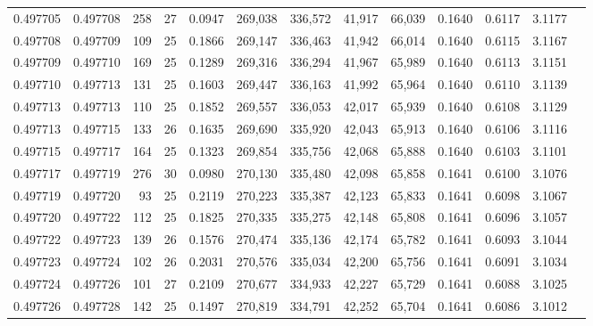 \begin{tabular}{rrrrrrrrrrrrr}
0.497705 & 0.497708 & 258 &  27 &                                     0.0947 & 269,038 & 336,572 &  41,917 &  66,039 & 0.1640 & 0.6117 & 3.1177 \\
0.497708 & 0.497709 & 109 &  25 &                                     0.1866 & 269,147 & 336,463 &  41,942 &  66,014 & 0.1640 & 0.6115 & 3.1167 \\
0.497709 & 0.497710 & 169 &  25 &                                     0.1289 & 269,316 & 336,294 &  41,967 &  65,989 & 0.1640 & 0.6113 & 3.1151 \\
0.497710 & 0.497713 & 131 &  25 &                                     0.1603 & 269,447 & 336,163 &  41,992 &  65,964 & 0.1640 & 0.6110 & 3.1139 \\
0.497713 & 0.497713 & 110 &  25 &                                     0.1852 & 269,557 & 336,053 &  42,017 &  65,939 & 0.1640 & 0.6108 & 3.1129 \\
0.497713 & 0.497715 & 133 &  26 &                                     0.1635 & 269,690 & 335,920 &  42,043 &  65,913 & 0.1640 & 0.6106 & 3.1116 \\
0.497715 & 0.497717 & 164 &  25 &                                     0.1323 & 269,854 & 335,756 &  42,068 &  65,888 & 0.1640 & 0.6103 & 3.1101 \\
0.497717 & 0.497719 & 276 &  30 &                                     0.0980 & 270,130 & 335,480 &  42,098 &  65,858 & 0.1641 & 0.6100 & 3.1076 \\
0.497719 & 0.497720 &  93 &  25 &                                     0.2119 & 270,223 & 335,387 &  42,123 &  65,833 & 0.1641 & 0.6098 & 3.1067 \\
0.497720 & 0.497722 & 112 &  25 &                                     0.1825 & 270,335 & 335,275 &  42,148 &  65,808 & 0.1641 & 0.6096 & 3.1057 \\
0.497722 & 0.497723 & 139 &  26 &                                     0.1576 & 270,474 & 335,136 &  42,174 &  65,782 & 0.1641 & 0.6093 & 3.1044 \\
0.497723 & 0.497724 & 102 &  26 &                                     0.2031 & 270,576 & 335,034 &  42,200 &  65,756 & 0.1641 & 0.6091 & 3.1034 \\
0.497724 & 0.497726 & 101 &  27 &                                     0.2109 & 270,677 & 334,933 &  42,227 &  65,729 & 0.1641 & 0.6088 & 3.1025 \\
0.497726 & 0.497728 & 142 &  25 &                                     0.1497 & 270,819 & 334,791 &  42,252 &  65,704 & 0.1641 & 0.6086 & 3.1012 \\

\end{tabular}
